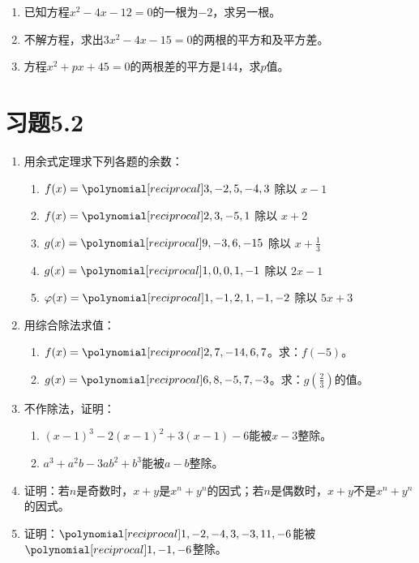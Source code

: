 \begin{ex}
\begin{enumerate}
    \item 已知方程$x^2-4x-12=0$的一根为$-2$，求另一根。
    \item 不解方程，求出$3x^2-4x-15=0$的两根的平方和及平方差。
    \item 方程$x^2+px+45=0$的两根差的平方是144，求$p$值。
\end{enumerate}
\end{ex}

\section*{习题5.2}

\begin{enumerate}
    \item 用余式定理求下列各题的余数：
\begin{enumerate}
    \item $f(x)=\poly{3,-2,5,-4,3}$ 除以 $x-1$
    \item $f(x)=\poly{2,3,-5,1}$ 除以 $x+2$
    \item $g(x)=\poly{9,-3,6,-15}$ 除以 $x+\frac{1}{3}$
    \item $g(x)=\poly{1,0,0,1,-1}$ 除以 $2x-1$
    \item $\varphi(x)=\poly{1,-1,2,1,-1,-2}$ 除以 $5x+3$
\end{enumerate}    
    
\item 用综合除法求值：
\begin{enumerate}
    \item $f(x)=\poly{2,7,-14,6,7}$。求：$f(-5)$。
    \item $g(x)=\poly{6,8,-5,7,-3}$。求：$g\left(\frac{2}{3}\right)$的值。
\end{enumerate}

\item 不作除法，证明：
\begin{enumerate}
    \item $(x-1)^3-2(x-1)^2+3(x-1)-6$能被$x-3$整除。
    \item $a^3+a^2b-3ab^2+b^3$能被$a-b$整除。
\end{enumerate}

\item 证明：若$n$是奇数时，$x+y$是$x^n+y^n$的因式；若$n$是偶数时，$x+y$不是$x^n+y^n$的因式。

\item 证明：$\poly{1,-2,-4,3,-3,11,-6}$能被$\poly{1,-1,-6}$整除。


\end{enumerate}
